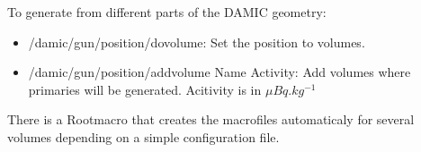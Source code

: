 \documentclass[français,final,twoside,12pt]{article}
\begin{document}
To generate from different parts of the DAMIC geometry:

\begin{itemize}
\item /damic/gun/position/dovolume: Set the position to volumes.
\item /damic/gun/position/addvolume Name Activity: Add volumes where primaries will be generated. Acitivity is in $\mu Bq.kg^{-1}$ 
\newline
\end{itemize}

There is a Rootmacro that creates the macrofiles automaticaly for several volumes depending on a simple configuration file.  
\end{document}
